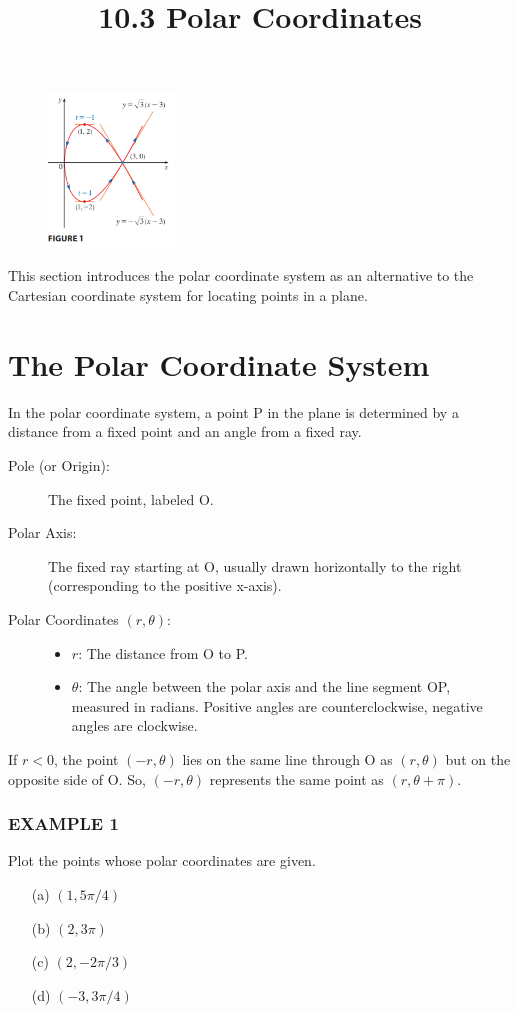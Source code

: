 \documentclass{article}
\title{10.3 Polar Coordinates}
\date{}
\author{}
\begin{document}
\begin{figure}[htbp]
    \centering
    \includegraphics[width=0.3\textwidth]{graph27.png}
\end{figure}
\maketitle
This section introduces the polar coordinate system as an alternative to the Cartesian coordinate system for locating points in a plane.

\section*{The Polar Coordinate System}
In the polar coordinate system, a point P in the plane is determined by a distance from a fixed point and an angle from a fixed ray.

\begin{description}
    \item[Pole (or Origin):] The fixed point, labeled O.
    \item[Polar Axis:] The fixed ray starting at O, usually drawn horizontally to the right (corresponding to the positive x-axis).
    \item[Polar Coordinates $(r, \theta)$:]
        \begin{itemize}
            \item $r$: The distance from O to P.
            \item $\theta$: The angle between the polar axis and the line segment OP, measured in radians. Positive angles are counterclockwise, negative angles are clockwise.
        \end{itemize}
\end{description}

If $r<0$, the point $(-r, \theta)$ lies on the same line through O as $(r, \theta)$ but on the opposite side of O. So, $(-r, \theta)$ represents the same point as $(r, \theta + \pi)$.

\subsubsection*{EXAMPLE 1}
Plot the points whose polar coordinates are given.
\begin{enumerate}
    \item[(a)] $(1, 5\pi/4)$
    \item[(b)] $(2, 3\pi)$
    \item[(c)] $(2, -2\pi/3)$
    \item[(d)] $(-3, 3\pi/4)$
\end{enumerate}
\end{document}
